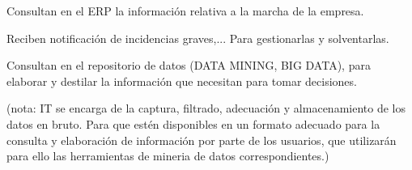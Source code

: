 \documentclass[spanish,12pt,a4paper,final,oneside]{book}
\begin{document}
Consultan en el ERP la información relativa a la marcha de la empresa.

Reciben notificación de incidencias graves,... Para gestionarlas y solventarlas.

Consultan en el repositorio de datos (DATA MINING, BIG DATA), para elaborar y destilar la información que necesitan para tomar decisiones.

(nota: IT se encarga de la captura, filtrado, adecuación y almacenamiento de los datos en bruto. Para que estén disponibles en un formato adecuado para la consulta y elaboración de información por parte de los usuarios, que utilizarán para ello las herramientas de mineria de datos correspondientes.)
\end{document}
